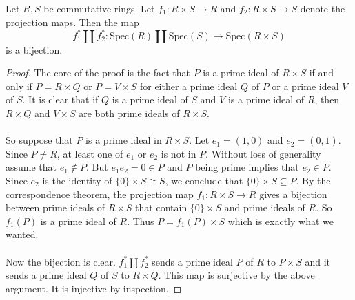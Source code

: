 \documentclass[a4paper]{article}
\begin{document}
\begin{lmm}{}{} Let $R,S$ be commutative rings. Let $f_1:R\times S\to R$ and $f_2:R\times S\to S$ denote the projection maps. Then the map $$f_1^\ast\amalg f_2^\ast:\text{Spec}(R)\amalg\text{Spec}(S)\to\text{Spec}(R\times S)$$ is a bijection. \tcbline
\begin{proof}
The core of the proof is the fact that $P$ is a prime ideal of $R\times S$ if and only if $P=R\times Q$ or $P=V\times S$ for either a prime ideal $Q$ of $P$ or a prime ideal $V$ of $S$. It is clear that if $Q$ is a prime ideal of $S$ and $V$ is a prime ideal of $R$, then $R\times Q$ and $V\times S$ are both prime ideals of $R\times S$. \\~\\

So suppose that $P$ is a prime ideal in $R\times S$. Let $e_1=(1,0)$ and $e_2=(0,1)$. Since $P\neq R$, at least one of $e_1$ or $e_2$ is not in $P$. Without loss of generality assume that $e_1\notin P$. But $e_1e_2=0\in P$ and $P$ being prime implies that $e_2\in P$. Since $e_2$ is the identity of $\{0\}\times S\cong S$, we conclude that $\{0\}\times S\subseteq P$. By the correspondence theorem, the projection map $f_1:R\times S\to R$ gives a bijection between prime ideals of $R\times S$ that contain $\{0\}\times S$ and prime ideals of $R$. So $f_1(P)$ is a prime ideal of $R$. Thus $P=f_1(P)\times S$ which is exactly what we wanted. \\~\\

Now the bijection is clear. $f_1^\ast\amalg f_2^\ast$ sends a prime ideal $P$ of $R$ to $P\times S$ and it sends a prime ideal $Q$ of $S$ to $R\times Q$. This map is surjective by the above argument. It is injective by inspection. 
\end{proof}
\end{lmm}
\end{document}
